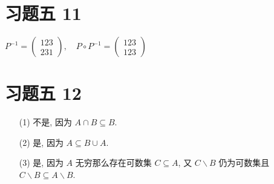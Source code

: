 \section{习题五 11}
\begin{solution}
	$
	P^{-1}=\left(\begin{array}{c}
		123 \\
		231
	\end{array}\right)
	,\quad
	P\circ P^{-1}=\left(\begin{array}{c}
		123 \\
		123
	\end{array}\right)
	$
\end{solution}
\section{习题五 12}
\begin{solution}
	\begin{itemize}
		\item[(1)] 不是, 因为 $A\cap B \subseteq B$.
		\item[(2)] 是, 因为 $A \subseteq B\cup A$.
		\item[(3)] 是, 因为 $A$ 无穷那么存在可数集 $C\subseteq A$, 又 $C\backslash B$ 仍为可数集且 $C\backslash B \subseteq A\backslash B$.
	\end{itemize}
\end{solution}
